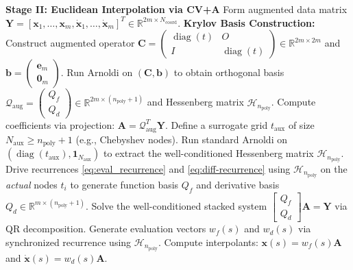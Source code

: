 \documentclass[11pt]{article}
\begin{document}
\begin{algorithm}[H]
\begin{algorithmic}[1]
\medskip
\STATE \textbf{Stage II: Euclidean Interpolation via CV+A}
\STATE Form augmented data matrix $\mathbf{Y} = [\mathbf{x}_1, \dots, \mathbf{x}_m, \dot{\mathbf{x}}_1, \dots, \dot{\mathbf{x}}_m]^T \in \mathbb{R}^{2m \times N_{\text{coord}}}$.
\STATE \textbf{Krylov Basis Construction:}
\STATE Construct augmented operator $\mathbf{C} = \begin{pmatrix} \operatorname{diag}(t) & O \\ I & \operatorname{diag}(t) \end{pmatrix} \in \mathbb{R}^{2m \times 2m}$ and $\mathbf{b} = \begin{pmatrix} \mathbf{e}_m \\ \mathbf{0}_m \end{pmatrix}$.
\STATE Run Arnoldi on $(\mathbf{C}, \mathbf{b})$ to obtain orthogonal basis $\mathcal{Q}_{\text{aug}} = \begin{pmatrix} Q_f \\ Q_d \end{pmatrix} \in \mathbb{R}^{2m \times (n_{\text{poly}}+1)}$ and Hessenberg matrix $\mathcal{H}_{n_{\text{poly}}}$.
\STATE Compute coefficients via projection: $\mathbf{A} = \mathcal{Q}_{\text{aug}}^T \mathbf{Y}$.
\STATE Define a surrogate grid $t_{\text{aux}}$ of size $N_{\text{aux}} \ge n_{\text{poly}}+1$ (e.g., Chebyshev nodes).
\STATE Run standard Arnoldi on $( \operatorname{diag}(t_{\text{aux}}), \mathbf{1}_{N_{\text{aux}}} )$ to extract the well-conditioned Hessenberg matrix $\mathcal{H}_{n_{\text{poly}}}$.
\STATE Drive recurrences \eqref{eq:eval_recurrence} and \eqref{eq:diff-recurrence} using $\mathcal{H}_{n_{\text{poly}}}$ on the \textit{actual} nodes $t_i$ to generate function basis $Q_f$ and derivative basis $Q_d \in \mathbb{R}^{m \times (n_{\text{poly}}+1)}$.
\STATE Solve the well-conditioned stacked system $\begin{bmatrix} Q_f \\ Q_d \end{bmatrix} \mathbf{A} = \mathbf{Y}$ via QR decomposition.
\ENDIF
\STATE Generate evaluation vectors $w_f(s)$ and $w_d(s)$ via synchronized recurrence using $\mathcal{H}_{n_{\text{poly}}}$.
\STATE Compute interpolants: $\mathbf{x}(s) = w_f(s) \mathbf{A}$ and $\dot{\mathbf{x}}(s) = w_d(s) \mathbf{A}$.


\end{algorithmic}
\end{algorithm}
\end{document}
